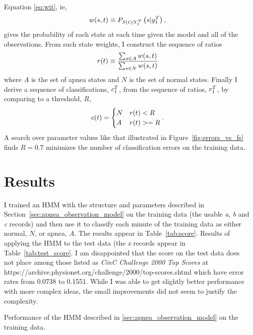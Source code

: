 Equation \eqref{eq:wit}, ie,
\begin{equation*}
  w(s,t) \equiv P_{{S}{(t)}|Y_{1}^{T}} \left(s|y_{1}^{T}
  \right),
\end{equation*}
gives the probability of each state at each time given the model and
all of the observations.  From such state weights, I construct the
sequence of ratios
\begin{equation*}
  {r}{(t)} \equiv \frac{\sum_{s\in A} w(s,t)}{\sum_{s\in N} w(s,t)}
\end{equation*}
where $A$ is the set of apnea states and $N$ is the set of normal
states.  Finally I derive a sequence of classifications,
$c_{1}^{T}$, from the sequence of ratios, $r_{1}^{T}$, by
comparing to a threshold, $R$,
\begin{equation}
  \label{eq:class_sequence}
  {c}{(t)} =
  \begin{cases}
    N & {r}{(t)} < R \\
    A & {r}{(t)} >= R
  \end{cases}.
\end{equation}
A search over parameter values like that illustrated in
Figure~\ref{fig:errors_vs_fs} finds $R=0.7$ minimizes the number of
classification errors on the training data.

\section{Results}
\label{sec:results}

I trained an HMM with the structure and parameters described in
Section~\ref{sec:apnea_observation_model} on the training data (the
usable \emph{a}, \emph{b} and \emph{c} records) and then use it to
classify each minute of the training data as either normal, $N$, or
apnea, $A$.  The results appear in Table~\ref{tab:score}.  Results of
applying the HMM to the test data (the \emph{x} records appear in
Table~\ref{tab:test_score}.  I am disappointed that the score on the
test data does not place among those listed as \emph{CinC Challenge
  2000 Top Scores} at
https://archive.physionet.org/challenge/2000/top-scores.shtml which
have error rates from 0.0738 to 0.1551.  While I was able to get
slightly better performance with more complex ideas, the small
improvements did not seem to justify the complexity.

\begin{table*}
  \centering
  
  \caption[Performance]{Performance of the HMM described in
    \ref{sec:apnea_observation_model} on the training data.}
  \label{tab:score}
\end{table*}


